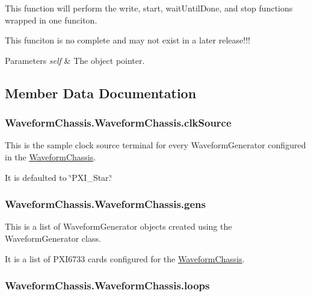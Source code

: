 This function will perform the write, start, wait\-Until\-Done, and stop functions wrapped in one funciton. 

This funciton is no complete and may not exist in a later release!!! 
\begin{DoxyParams}{Parameters}
{\em self} & The object pointer. \\
\hline
\end{DoxyParams}


\subsection{Member Data Documentation}
\hypertarget{class_waveform_chassis_1_1_waveform_chassis_a5914d44a4e532bed3845206318dd8407}{
\subsubsection[{clk\-Source}]{\setlength{\rightskip}{0pt plus 5cm}Waveform\-Chassis.\-Waveform\-Chassis.\-clk\-Source}}\label{class_waveform_chassis_1_1_waveform_chassis_a5914d44a4e532bed3845206318dd8407}


This is the sample clock source terminal for every Waveform\-Generator configured in the \hyperlink{class_waveform_chassis_1_1_waveform_chassis}{Waveform\-Chassis}. 

It is defaulted to \char`\"{}\-P\-X\-I\-\_\-\-Star.\char`\"{} \hypertarget{class_waveform_chassis_1_1_waveform_chassis_a9b7abe44035b7e5077bfe7363221d66f}{
\subsubsection[{gens}]{\setlength{\rightskip}{0pt plus 5cm}Waveform\-Chassis.\-Waveform\-Chassis.\-gens}}\label{class_waveform_chassis_1_1_waveform_chassis_a9b7abe44035b7e5077bfe7363221d66f}


This is a list of Waveform\-Generator objects created using the Waveform\-Generator class. 

It is a list of P\-X\-I6733 cards configured for the \hyperlink{class_waveform_chassis_1_1_waveform_chassis}{Waveform\-Chassis}. \hypertarget{class_waveform_chassis_1_1_waveform_chassis_ab1d1e2c6f2742589ae187a6d12c26565}{
\subsubsection[{loops}]{\setlength{\rightskip}{0pt plus 5cm}Waveform\-Chassis.\-Waveform\-Chassis.\-loops}}\label{class_waveform_chassis_1_1_waveform_chassis_ab1d1e2c6f2742589ae187a6d12c26565}


